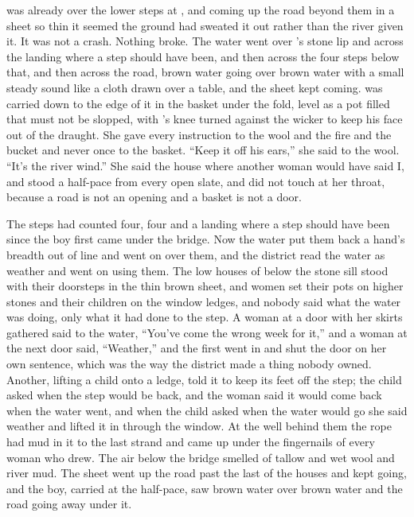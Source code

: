 
 was already over the lower steps at , and coming up the road beyond them in a sheet so thin it seemed the ground had sweated it out rather than the river given it. It was not a crash. Nothing broke. The water went over 's stone lip and across the landing where a step should have been, and then across the four steps below that, and then across the road, brown water going over brown water with a small steady sound like a cloth drawn over a table, and the sheet kept coming.  was carried down to the edge of it in the basket under the fold, level as a pot filled that must not be slopped, with 's knee turned against the wicker to keep his face out of the draught. She gave every instruction to the wool and the fire and the bucket and never once to the basket. “Keep it off his ears,” she said to the wool. “It's the river wind.” She said the house where another woman would have said I, and stood a half-pace from every open slate, and did not touch  at her throat, because a road is not an opening and a basket is not a door.

The steps had counted four, four and a landing where a step should have been since the boy first came under the bridge. Now the water put them back a hand's breadth out of line and went on over them, and the district read the water as weather and went on using them. The low houses of  below the stone sill stood with their doorsteps in the thin brown sheet, and women set their pots on higher stones and their children on the window ledges, and nobody said what the water was doing, only what it had done to the step. A woman at a door with her skirts gathered said to the water, “You've come the wrong week for it,” and a woman at the next door said, “Weather,” and the first went in and shut the door on her own sentence, which was the way the district made a thing nobody owned. Another, lifting a child onto a ledge, told it to keep its feet off the step; the child asked when the step would be back, and the woman said it would come back when the water went, and when the child asked when the water would go she said weather and lifted it in through the window. At the well behind them the rope had mud in it to the last strand and came up under the fingernails of every woman who drew. The air below the bridge smelled of tallow and wet wool and river mud. The sheet went up the road past the last of the houses and kept going, and the boy, carried at the half-pace, saw brown water over brown water and the road going away under it.

